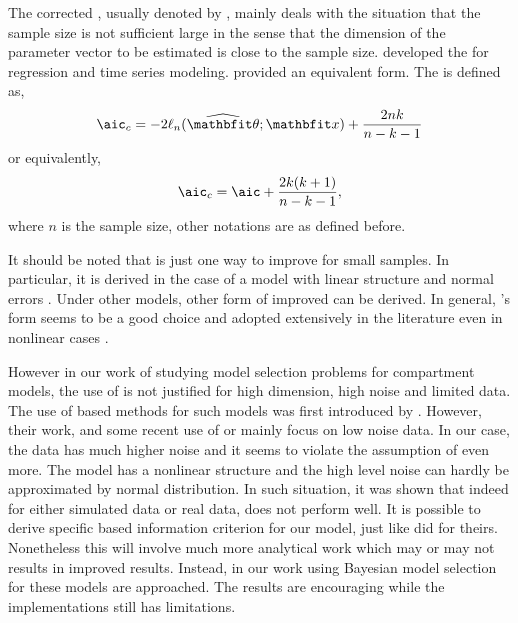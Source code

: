 The corrected \aic, usually denoted by \aicc, mainly deals with the situation
that the sample size is not sufficient large in the sense that the dimension
of the parameter vector to be estimated is close to the sample size.
\textcite{Hurvich1989} developed the \aicc for regression and time series
modeling. \textcite{Sugiura1978} provided an equivalent form. The \aicc is
defined as,
\begin{equation}
  \text{\aicc} = -2\ell_n(\hbth;\bfx) + \frac{2nk}{n-k-1}
\end{equation}
or equivalently,
\begin{equation}
  \text{\aicc} = \text{\aic} + \frac{2k(k+1)}{n-k-1},
\end{equation}
where $n$ is the sample size, other notations are as defined before.

It should be noted that \aicc is just one way to improve \aic for small
samples. In particular, it is derived in the case of a model with linear
structure and normal errors \parencite{Hurvich1989, Burnham2002}. Under other
models, other form of improved \aic can be derived. In general,
\textcite{Hurvich1989}'s form seems to be a good choice and adopted
extensively in the literature even in nonlinear cases
\parencite[e.g.][]{Turkheimer2003}.

However in our work of studying model selection problems for compartment
models, the use of \aicc is not justified for high dimension, high noise and
limited data. The use of \aic based methods for such models was first
introduced by \textcite{Hawkins1986}. However, their work, and some recent use
of \aic or \aicc mainly focus on low noise data. In our case, the data has
much higher noise and it seems to violate the assumption of \aicc even more.
The model has a nonlinear structure and the high level noise can hardly be
approximated by normal distribution. In such situation, it was shown that
indeed for either simulated data or real data, \aicc does not perform well. It
is possible to derive specific \aic based information criterion for our model,
just like \textcite{Hurvich1989} did for theirs. Nonetheless this will involve
much more analytical work which may or may not results in improved results.
Instead, in our work using Bayesian model selection for these models are
approached. The results are encouraging while the implementations still has
limitations.

